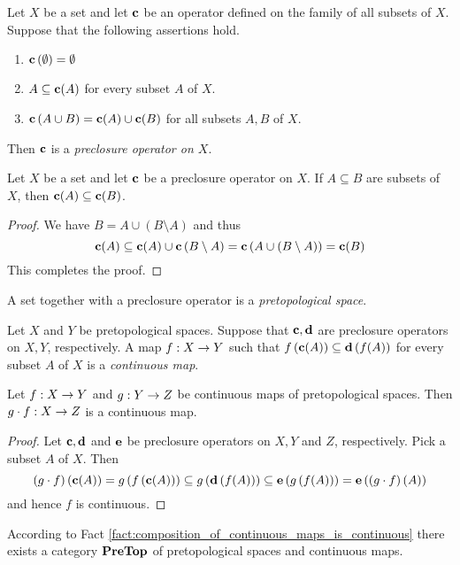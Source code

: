 \begin{definition}
	Let $X$ be a set and let $\mathbf{c}$ be an operator defined on the family of all subsets of $X$. Suppose that the following assertions hold.
	\begin{enumerate}[label=\textbf{(\arabic*)}, leftmargin=3.0em]
		\item $\mathbf{c}\left(\emptyset\right) = \emptyset$
		\item $A\subseteq \mathbf{c}(A)$ for every subset $A$ of $X$.
		\item $\mathbf{c}\left(A \cup B\right) = \mathbf{c}(A)\cup \mathbf{c}(B)$ for all subsets $A, B$ of $X$.
	\end{enumerate}
	Then $\mathbf{c}$ is a \textit{preclosure operator on $X$}.
\end{definition}


\begin{fact}\label{fact:preclosure_operator_is_monotone}
	Let $X$ be a set and let $\mathbf{c}$ be a preclosure operator on $X$. If $A\subseteq B$ are subsets of $X$, then $\mathbf{c}(A) \subseteq \mathbf{c}(B)$.
\end{fact}
\begin{proof}
	We have $B = A\cup \left(B\setminus A\right)$ and thus
	$$\mathbf{c}(A) \subseteq \mathbf{c}(A) \cup \mathbf{c}\left(B\setminus A\right) = \mathbf{c}\left(A \cup \left(B\setminus A\right) \right) = \mathbf{c}(B)$$
	This completes the proof.
\end{proof}

\begin{definition}
	A set together with a preclosure operator is a \textit{pretopological space}.
\end{definition}

\begin{definition}
	Let $X$ and $Y$ be pretopological spaces. Suppose that $\mathbf{c},\mathbf{d}$ are preclosure operators on $X,Y$, respectively. A map $f:X\rightarrow Y$ such that $f\left(\mathbf{c}(A)\right) \subseteq \mathbf{d}\left(f(A)\right)$ for every subset $A$ of $X$ is a \textit{continuous map}.
\end{definition}

\begin{fact}\label{fact:composition_of_continuous_maps_is_continuous}
	Let $f:X \rightarrow Y$ and $g:Y \rightarrow Z$ be continuous maps of pretopological spaces. Then $g\cdot f:X\rightarrow Z$ is a continuous map.
\end{fact}
\begin{proof}
	Let $\mathbf{c},\mathbf{d}$ and $\mathbf{e}$ be preclosure operators on $X,Y$ and $Z$, respectively. Pick a subset $A$ of $X$. Then
	$$\left(g\cdot f\right)\left(\mathbf{c}(A)\right) = g\left(f\left(\mathbf{c}(A)\right)\right) \subseteq g\left(\mathbf{d}\left(f(A)\right)\right) \subseteq \mathbf{e}\left(g\left(f(A)\right)\right) = \mathbf{e}\left(\left(g\cdot f\right)(A)\right)$$
	and hence $f$ is continuous.
\end{proof}
\noindent
According to Fact \ref{fact:composition_of_continuous_maps_is_continuous} there exists a category $\mathbf{PreTop}$ of pretopological spaces and continuous maps.

